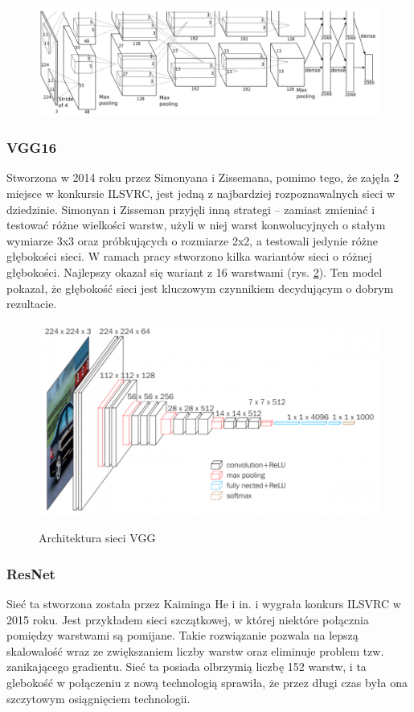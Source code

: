 \documentclass[a4paper,twoside,12pt]{book}
\begin{document}
{\begin{figure}[h]
\centering
\includegraphics[scale=0.24]{alex.png}
\label{AlexNet}
\end{figure}

\subsubsection{VGG16\cite{simonyan2014very}}
{Stworzona w 2014 roku przez Simonyana i Zissemana, pomimo tego, że zajęła 2 miejsce w konkursie ILSVRC, jest jedną z najbardziej rozpoznawalnych sieci w dziedzinie. Simonyan i Zisseman przyjęli inną strategi – zamiast zmieniać i testować różne wielkości warstw, użyli w niej warst konwolucyjnych o stałym wymiarze 3x3 oraz próbkujących o rozmiarze 2x2, a testowali jedynie różne głębokości sieci. W ramach pracy stworzono kilka wariantów sieci o różnej głębokości. Najlepszy okazał się wariant z 16 warstwami (rys. \ref{VGG}). Ten model pokazał, że głębokość sieci jest kluczowym czynnikiem decydującym o dobrym rezultacie.}
\begin{figure}[h!]
\caption{Architektura sieci VGG}

\centering
\includegraphics[scale=0.4]{VGG.png}
\label{VGG}
\end{figure}







\subsubsection{ResNet\cite{he2016deep}}
{Sieć ta stworzona została przez Kaiminga He i in. i wygrała konkurs ILSVRC w 2015 roku. Jest przykładem sieci szczątkowej, w której niektóre połącznia pomiędzy warstwami są pomijane. Takie rozwiązanie pozwala na lepszą skalowalość wraz ze zwiększaniem liczby warstw oraz eliminuje problem tzw. zanikającego gradientu. Sieć ta posiada olbrzymią liczbę 152 warstw, i ta glebokość w połączeniu z nową technologią sprawiła, że przez długi czas była ona szczytowym osiągnięciem technologii.}

}
\end{document}
